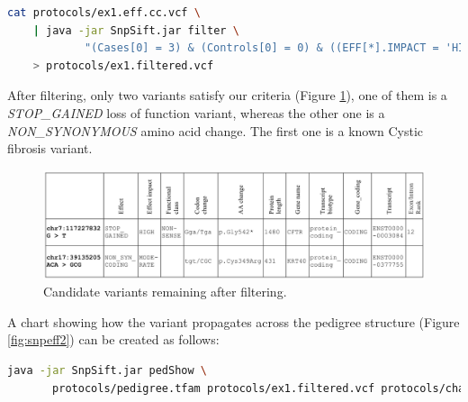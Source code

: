 \begin{lstlisting}[language=bash]
cat protocols/ex1.eff.cc.vcf \
    | java -jar SnpSift.jar filter \
            "(Cases[0] = 3) & (Controls[0] = 0) & ((EFF[*].IMPACT = 'HIGH') | (EFF[* ].IMPACT = 'MODERATE'))" \
    > protocols/ex1.filtered.vcf
\end{lstlisting}

After filtering, only two variants satisfy our criteria (Figure \ref{fig:snpefffilteredvars}), one of them is a \textit{STOP\_GAINED} loss of function variant, whereas the other one is a \textit{NON\_SYNONYMOUS} amino acid change. The first one is a known Cystic fibrosis variant.

\begin{figure}
    \centering
    \includegraphics[width=14cm]{snpeff_table_variants_filtered.png}
    \caption{Candidate variants remaining after filtering.}
    \label{fig:snpefffilteredvars}
\end{figure}

A chart showing how the variant propagates across the pedigree structure (Figure \ref{fig:snpeff2}) can be created as follows:

\begin{lstlisting}[language=bash]
java -jar SnpSift.jar pedShow \
       protocols/pedigree.tfam protocols/ex1.filtered.vcf protocols/chart
\end{lstlisting}

